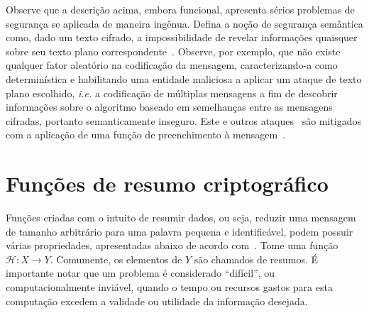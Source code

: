 \documentclass{ufsctex/ufsctex}
\begin{document}
Observe que a descrição acima, embora funcional, apresenta sérios problemas de
segurança se aplicada de maneira ingênua. Defina a noção de segurança semântica
como, dado um texto cifrado, a impossibilidade de revelar informações quaisquer
sobre seu texto plano correspondente~\cite{Goldwasser:inproc:1982:may}.
Observe, por exemplo, que não existe qualquer fator aleatório na codificação da
mensagem, caracterizando-a como determinística e habilitando uma entidade
maliciosa a aplicar um ataque de texto plano escolhido, \emph{i.e.} a
codificação de múltiplas mensagens a fim de descobrir informações sobre o
algoritmo baseado em semelhanças entre as mensagens cifradas, portanto
semanticamente inseguro. Este e outros ataques~\cite{Boneh:article:1999:feb}
são mitigados com a aplicação de uma função de preenchimento à
mensagem~\cite{Bellare:inproc:1994:may}.

\section{Funções de resumo criptográfico}\label{section:hashfunc}

Funções criadas com o intuito de resumir dados, ou seja, reduzir uma mensagem
de tamanho arbitrário para uma palavra pequena e identificável, podem possuir
várias propriedades, apresentadas abaixo de acordo com~\cite[Seção
9.2]{Menezes:book:1996}. Tome uma função $\mathcal{H} : X \longrightarrow Y$.
Comumente, os elementos de $Y$ são chamados de resumos. É importante notar que
um problema é considerado ``difícil'', ou computacionalmente inviável, quando o
tempo ou recursos gastos para esta computação excedem a validade ou utilidade
da informação desejada.
\end{document}
